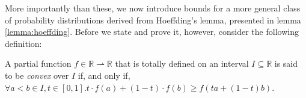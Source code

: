 	More importantly than these, we now introduce bounds for a more general class of 
	probability distributions derived from Hoeffding's lemma, presented in lemma 
	\ref{lemma:hoeffding}. Before we state and prove it, however, consider the following 
	definition:
	\begin{definition}
		A partial function $f \in \mathbb{R} \rightharpoonup \mathbb{R}$ that is totally
		defined on an interval $I\subseteq\mathbb{R}$ is said to be \emph{convex} over $I$
		if, and only if, $\forall a<b\in I,t\in[0,1].t\cdot f(a)+(1-t)\cdot f(b) \geq
		f(ta+(1-t)b)$.
	\end{definition}
	\begin{comment}
		The usual explanation for this is that the straight line connecting $f(a)$ and 
		$f(b)$ is above the graph of $f$ on $[a,b]$.
	\end{comment}

